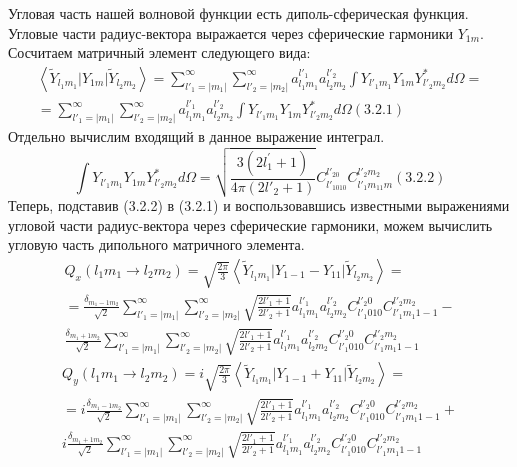 Угловая часть нашей волновой функции есть диполь-сферическая функция. Угловые части радиус-вектора выражается через сферические гармоники  $Y_{1m}$.
Сосчитаем матричный элемент следующего вида:
\begin{multline*}
\left<\widetilde Y_{l_1 m_1}|Y_{1m}|\widetilde Y_{l_2 m_2} \right> =\sum_{l'_1=|m_1 |}^{\infty}\sum_{l'_2=|m_2|}^{\infty}a_{l_1 m_1}^{l'_1} a_{l_2 m_2}^{l'_2} \int Y_{l'_1 m_1} Y_{1m} Y_{l'_2 m_2}^* d\Omega=
\\
=\sum_{l'_1=|m_1|}^{\infty} \sum_{l'_2=|m_2 |}^{\infty} a_{l_1 m_1}^{l'_1} a_{l_2 m_2}^{l'_2} \int Y_{l'_1 m_1} Y_{1m} Y_{l'_2 m_2}^* d\Omega   (3.2.1)
\end{multline*}
Отдельно вычислим входящий в данное выражение интеграл.
\begin{equation*}
	\int Y_{l'_1m_1}Y_{1m}Y_{l'_2m_2}^{\ast }\mathit{d\Omega }=
	\sqrt{
		\frac{3(2l^{'}_{1}+1)}{4\pi (2l{'}_2 +1)}
	}
	C_{l{'}_{1010}}^{l{'}_{20}}C_{l{'}_1 m_11 m}^{l{'}_2m_2}
	(3.2.2)
\end{equation*}
Теперь, подставив (3.2.2) в (3.2.1) и воспользовавшись известными выражениями угловой части радиус-вектора через сферические гармоники, можем вычислить угловую часть дипольного матричного элемента.
\begin{multline*}
Q_x\left(l_1m_1\rightarrow l_2m_2\right)=\sqrt{\frac{2\pi } 3} \left< \widetilde Y_{l_1m_1}|Y_{1-1}-Y_{11}|\widetilde Y_{l_2m_2} \right> = 
\\
= \frac{\delta_{m_1-1 m_2}}{\sqrt{2}}\sum_{l'_1=|m_1|}^{\infty} \sum_{l'_2=|m_2|}^{\infty}\sqrt{\frac{2l'_1+1}{2l'_2+1}}a_{l_1 m_1}^{l'_1 } a_{l_2 m_2}^{l'_2} C_{l'_1 010}^{l'_2 0} C_{l'_1 m_1 1-1}^{l'_2 m_2 }-
\\
\frac{\delta_{m_1+1 m_2}}{\sqrt{2}}\sum_{l'_1=|m_1|}^{\infty} \sum_{l'_2=|m_2|}^{\infty}\sqrt{\frac{2l'_1+1}{2l'_2+1}}a_{l_1 m_1}^{l'_1 } a_{l_2 m_2}^{l'_2} C_{l'_1 010}^{l'_2 0} C_{l'_1 m_1 1-1}^{l'_2 m_2 }
\end{multline*}
\begin{multline*}
Q_y\left(l_1m_1\rightarrow l_2m_2\right)=i\sqrt{\frac{2\pi } 3} \left< \widetilde Y_{l_1m_1}|Y_{1-1}+Y_{11}|\widetilde Y_{l_2m_2} \right> =
\\
= i\frac{\delta_{m_1-1 m_2}}{\sqrt{2}}\sum_{l'_1=|m_1|}^{\infty} \sum_{l'_2=|m_2|}^{\infty}\sqrt{\frac{2l'_1+1}{2l'_2+1}}a_{l_1 m_1}^{l'_1 } a_{l_2 m_2}^{l'_2} C_{l'_1 010}^{l'_2 0} C_{l'_1 m_1 1-1}^{l'_2 m_2 }+
\\
i\frac{\delta_{m_1+1 m_2}}{\sqrt{2}}\sum_{l'_1=|m_1|}^{\infty} \sum_{l'_2=|m_2|}^{\infty}\sqrt{\frac{2l'_1+1}{2l'_2+1}}a_{l_1 m_1}^{l'_1 } a_{l_2 m_2}^{l'_2} C_{l'_1 010}^{l'_2 0} C_{l'_1 m_1 1-1}^{l'_2 m_2 }
\end{multline*}
